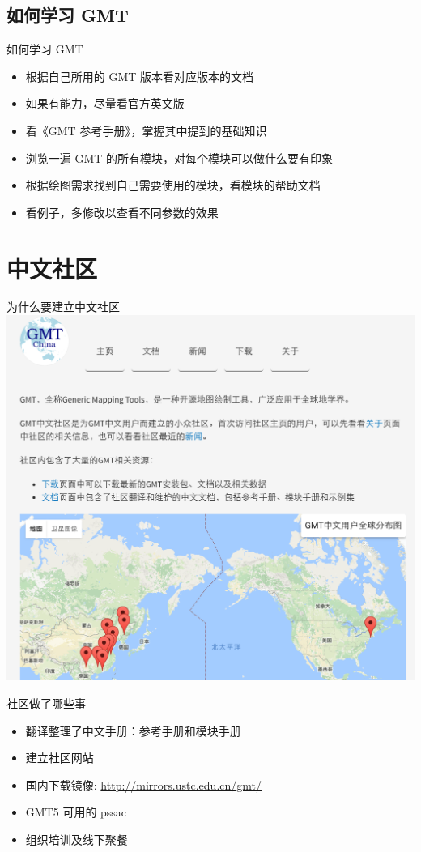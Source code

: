 \documentclass[UTF8, 11pt]{ctexbeamer}
\begin{document}
\subsection{如何学习 GMT}
\begin{frame}{如何学习 GMT}
\begin{itemize}
\item 根据自己所用的 GMT 版本看对应版本的文档
\item 如果有能力，尽量看官方英文版
\item 看《GMT 参考手册》，掌握其中提到的基础知识
\item 浏览一遍 GMT 的所有模块，对每个模块可以做什么要有印象
\item 根据绘图需求找到自己需要使用的模块，看模块的帮助文档
\item 看例子，多修改以查看不同参数的效果
\end{itemize}
\end{frame}

\section{中文社区}
\begin{frame}{为什么要建立中文社区}
\includegraphics[width=\textwidth]{GMT_china_homepage}
\end{frame}
\begin{frame}{社区做了哪些事}
\begin{itemize}
\item 翻译整理了中文手册：参考手册和模块手册
\item 建立社区网站
\item 国内下载镜像: \url{http://mirrors.ustc.edu.cn/gmt/}
\item GMT5 可用的 pssac
\item 组织培训及线下聚餐
\end{itemize}
\end{frame}
\end{document}
